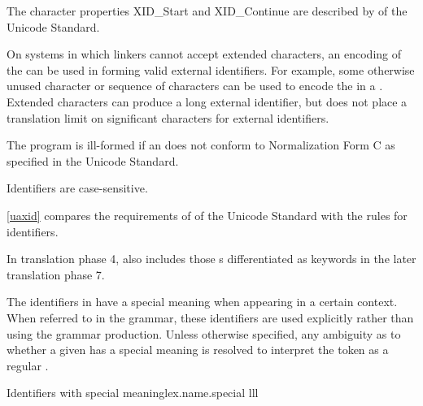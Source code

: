 \pnum
{}%
%
\begin{note}
The character properties XID_Start and XID_Continue are described by  of the Unicode Standard.
\begin{footnote}
On systems in which linkers cannot accept extended
characters, an encoding of the  can be used in
forming valid external identifiers. For example, some otherwise unused
character or sequence of characters can be used to encode the
 in a . Extended
characters can produce a long external identifier, but \Cpp{} does not
place a translation limit on significant characters for external
identifiers.
\end{footnote}
\end{note}
The program is ill-formed
if an  does not conform to
Normalization Form C as specified in the Unicode Standard.
\begin{note}
Identifiers are case-sensitive.
\end{note}
\begin{note}
\ref{uaxid} compares the requirements of  of the Unicode Standard
with the \Cpp{} rules for identifiers.
\end{note}
\begin{note}
In translation phase 4,
 also includes
those s
differentiated as keywords
in the later translation phase 7.
\end{note}

\pnum
{}%
%
%
%
%
%
The identifiers in  have a special meaning when
appearing in a certain context. When referred to in the grammar, these identifiers
are used explicitly rather than using the  grammar production.
Unless otherwise specified, any ambiguity as to whether a given
 has a special meaning is resolved to interpret the
token as a regular .

\begin{multicolfloattable}{Identifiers with special meaning}{lex.name.special}
{lll}
                                 \\
                              \\
\columnbreak
{}                                \\
               \\
\columnbreak
{}                                \\
     \\
\end{multicolfloattable}

